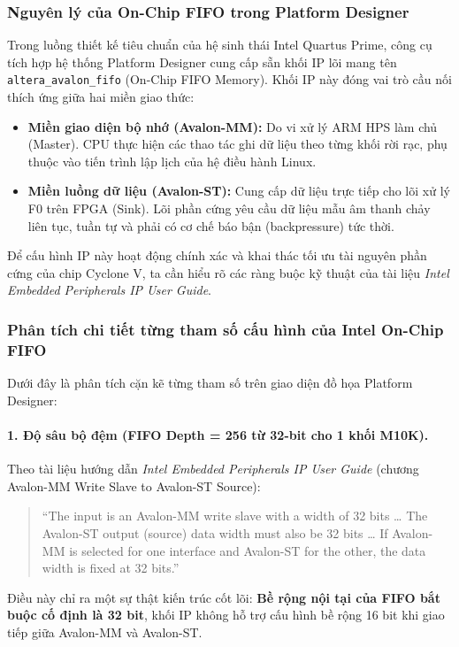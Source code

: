 \subsubsection*{Nguyên lý của On-Chip FIFO trong Platform Designer}
Trong luồng thiết kế tiêu chuẩn của hệ sinh thái Intel Quartus Prime, công cụ tích hợp hệ thống Platform Designer cung cấp sẵn khối IP lõi mang tên \texttt{altera\_avalon\_fifo} (On-Chip FIFO Memory). Khối IP này đóng vai trò cầu nối thích ứng giữa hai miền giao thức:
\begin{itemize}[leftmargin=1.5em, itemsep=2pt]
    \item \textbf{Miền giao diện bộ nhớ (Avalon-MM):} Do vi xử lý ARM HPS làm chủ (Master). CPU thực hiện các thao tác ghi dữ liệu theo từng khối rời rạc, phụ thuộc vào tiến trình lập lịch của hệ điều hành Linux.
    \item \textbf{Miền luồng dữ liệu (Avalon-ST):} Cung cấp dữ liệu trực tiếp cho lõi xử lý F0 trên FPGA (Sink). Lõi phần cứng yêu cầu dữ liệu mẫu âm thanh chảy liên tục, tuần tự và phải có cơ chế báo bận (backpressure) tức thời.
\end{itemize}

Để cấu hình IP này hoạt động chính xác và khai thác tối ưu tài nguyên phần cứng của chip Cyclone V, ta cần hiểu rõ các ràng buộc kỹ thuật của tài liệu \emph{Intel Embedded Peripherals IP User Guide}.

\subsubsection*{Phân tích chi tiết từng tham số cấu hình của Intel On-Chip FIFO}
Dưới đây là phân tích cặn kẽ từng tham số trên giao diện đồ họa Platform Designer:

\paragraph{1. Độ sâu bộ đệm (FIFO Depth = 256 từ 32-bit cho 1 khối M10K).}
Theo tài liệu hướng dẫn \emph{Intel Embedded Peripherals IP User Guide} (chương Avalon-MM Write Slave to Avalon-ST Source):
\begin{quote}
``The input is an Avalon-MM write slave with a width of 32 bits \dots{} The Avalon-ST output (source) data width must also be 32 bits \dots{} If Avalon-MM is selected for one interface and Avalon-ST for the other, the data width is fixed at 32 bits.''
\end{quote}
Điều này chỉ ra một sự thật kiến trúc cốt lõi: \textbf{Bề rộng nội tại của FIFO bắt buộc cố định là 32 bit}, khối IP không hỗ trợ cấu hình bề rộng 16 bit khi giao tiếp giữa Avalon-MM và Avalon-ST.

